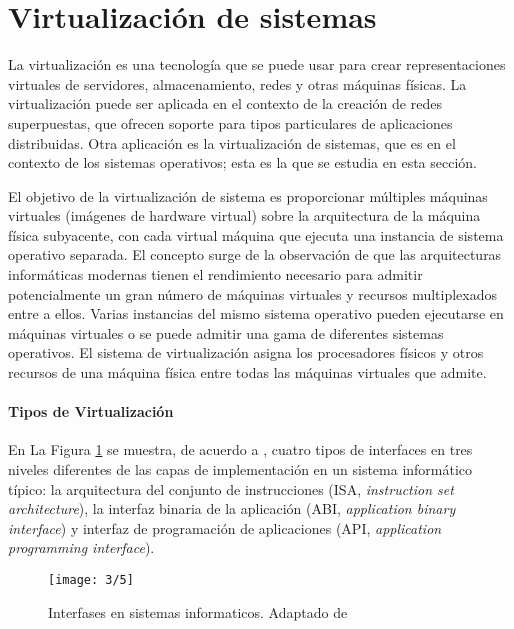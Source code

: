 
	
	\section{Virtualizaci\'on de sistemas}   
	La virtualización es una tecnología que se puede usar para crear representaciones virtuales de servidores, almacenamiento, redes y otras máquinas físicas.
	La virtualización puede ser aplicada en el contexto de la creación de \gls{redes superpuestas}, que ofrecen soporte para tipos particulares de aplicaciones  distribuidas. Otra aplicación es la virtualización de sistemas, que es en el contexto  de los sistemas operativos; esta es la que se estudia en esta sección. 
	
	El objetivo de la virtualización de sistema \cite{Coulouris2011} es proporcionar múltiples máquinas virtuales (imágenes de hardware virtual) sobre la arquitectura de la máquina física subyacente, con cada virtual máquina que ejecuta una instancia de sistema operativo separada. El concepto surge de la 	observación de que las arquitecturas informáticas modernas tienen el rendimiento necesario para 	admitir potencialmente un gran número de máquinas virtuales y recursos multiplexados entre
	a ellos. Varias instancias del mismo sistema operativo pueden ejecutarse en máquinas virtuales o se puede admitir una gama de diferentes sistemas operativos. El sistema de virtualización asigna los procesadores físicos y otros recursos de una máquina física entre todas las máquinas virtuales que admite.
	
	\paragraph{Tipos de Virtualización} 
 
	
	En La Figura \ref{fig:virtualizacion-API} se  muestra, de acuerdo a \cite{Smith2005},  cuatro tipos de interfaces en tres niveles diferentes de las capas de implementación en un sistema informático típico: la arquitectura del conjunto de instrucciones (ISA, \textit{instruction set architecture}), la interfaz binaria de la aplicación (ABI, \textit{application binary interface}) y  interfaz de programación de aplicaciones (API, \textit{application programming interface}).
	
			  \begin{figure}  
			  	  \begin{center} %
		\texttt{[image: 3/5]}	 
		\caption{Interfases en sistemas informaticos. Adaptado  de \cite{Smith2005}}
		\label{fig:virtualizacion-API}
	 \end{center} 
 \end{figure} 
	
